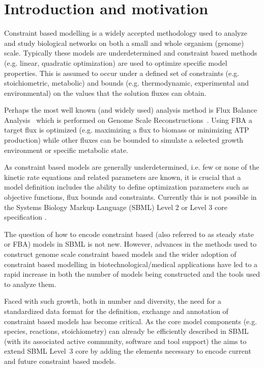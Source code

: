 
\section{ Introduction and motivation }
\label{intro}

Constraint based modelling is a widely accepted methodology used to analyze and study biological networks on both a small and whole organism (genome) scale. Typically these models are underdetermined and constraint based methods (e.g. linear, quadratic optimization) are used to optimize specific model properties. This is assumed to occur under a defined set of constraints (e.g. stoichiometric, metabolic) and bounds (e.g. thermodynamic, experimental and environmental) on the values that the solution fluxes can obtain.

Perhaps the most well known (and widely used) analysis method is Flux Balance Analysis~\citep[FBA; ][]{orth_2010} which is performed on Genome Scale Reconstructions~\citep[GSR's; ][]{oberhardt_2009}. Using FBA a target flux is optimized (e.g. maximizing a flux to biomass or minimizing ATP production) while other fluxes can be bounded to simulate a selected growth environment or specific metabolic state.

As constraint based models are generally underdetermined, i.e. few or none of the kinetic rate equations and related parameters are known, it is crucial that a model definition includes the ability to define optimization parameters such as objective functions, flux bounds and constraints. Currently this is not possible in the Systems Biology Markup Language (SBML) Level 2 or Level 3 core specification \citep{sbml, sbml3core}.

The question of how to encode constraint based (also referred to as steady state or FBA) models in SBML is not new. However, advances in the methods used to construct genome scale constraint based models and the wider adoption of constraint based modelling in biotechnological/medical applications have led to a rapid increase in both the number of models being constructed and the tools used to analyze them.

Faced with such growth, both in number and diversity, the need for a standardized data format for the definition, exchange and annotation of constraint based models has become critical. As the core model components (e.g. species, reactions, stoichiometry) can already be efficiently described in SBML (with its associated active community, software and tool support) the \FBCPackage aims to extend SBML Level~3 core by adding the elements necessary to encode current and future constraint based models.


